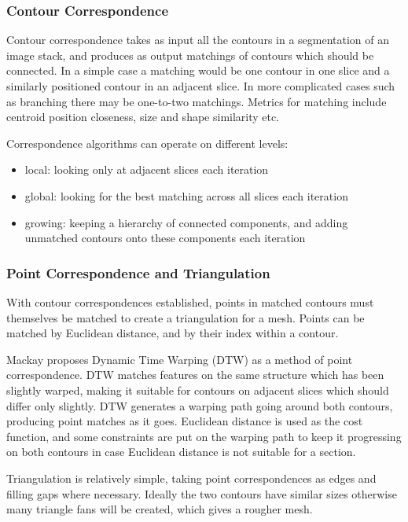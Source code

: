 \documentclass[11pt]{article}
\begin{document}
\subsubsection{Contour Correspondence}

Contour correspondence takes as input all the contours in a segmentation of an image stack, and produces as output matchings of contours which should be connected. In a simple case a matching would be one contour in one slice and a similarly positioned contour in an adjacent slice. In more complicated cases such as branching there may be one-to-two matchings. Metrics for matching include centroid position closeness, size and shape similarity etc.

Correspondence algorithms can operate on different levels:
\begin{itemize}
\item local: looking only at adjacent slices each iteration
\item global: looking for the best matching across all slices each iteration
\item growing: keeping a hierarchy of connected components, and adding unmatched contours onto these components each iteration
\end{itemize}

\subsubsection{Point Correspondence and Triangulation}

With contour correspondences established, points in matched contours must themselves be matched to create a triangulation for a mesh. Points can be matched by Euclidean distance, and by their index within a contour. 

Mackay \cite{mackay2019robust} proposes Dynamic Time Warping (DTW) as a method of point correspondence. DTW matches features on the same structure which has been slightly warped, making it suitable for contours on adjacent slices which should differ only slightly. DTW generates a warping path going around both contours, producing point matches as it goes. Euclidean distance is used as the cost function, and some constraints are put on the warping path to keep it progressing on both contours in case Euclidean distance is not suitable for a section.

Triangulation is relatively simple, taking point correspondences as edges and filling gaps where necessary. Ideally the two contours have similar sizes otherwise many triangle fans will be created, which gives a rougher mesh.
\end{document}
